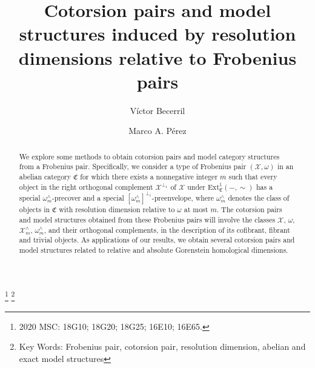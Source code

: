 \documentclass[10pt,reqno]{amsart}
\numberwithin{equation}{section}
\theoremstyle{remark}
\newcommand{\Ext}{\mathrm{Ext}}
\newcommand{\C}{\mathfrak{C}}
\newcommand{\X}{\mathcal{X}}
\begin{document}
\title[Complete Frobenius pairs]{Cotorsion pairs and model structures induced by resolution dimensions relative to Frobenius pairs}
\thanks{2020 MSC: 18G10; 18G20; 18G25; 16E10; 16E65.}
\thanks{Key Words: Frobenius pair, cotorsion pair, resolution dimension, abelian and exact model structures}

\author{V\'ictor Becerril}
\address[V. Becerril]{Centro de Ciencias Matem\'aticas. Universidad Nacional Aut\'onoma de M\'exico. 
 CP58089. Morelia, Michoac\'an, M\'EXICO}

\author{Marco A. P\'erez}
\address[M. A. P\'erez]{Instituto de Matem\'atica y Estad\'istica ``Prof. Ing. Rafael Laguardia''. Facultad de Ingenier\'ia. Universidad de la Rep\'ublica. CP11300. Montevideo, URUGUAY}



\maketitle


\begin{abstract}
We explore some methods to obtain cotorsion pairs and  model category structures from a Frobenius pair. Specifically, we consider a type of Frobenius pair $(\X,\omega)$ in an abelian category $\C$ for which there exists a nonnegative integer $m$ such that every object in the right orthogonal complement $\X^{\perp_1}$ of $\X$ under $\Ext^1_{\C}(-,\sim)$ has a special $\omega^\wedge_m$-precover and a special $[\omega^\wedge_m]^{\perp_1}$-preenvelope, where $\omega^\wedge_m$ denotes the class of objects in $\C$ with resolution dimension relative to $\omega$ at most $m$. The cotorsion pairs and model structures obtained from these Frobenius pairs will involve the classes $\X$, $\omega$, $\X^\wedge_m$, $\omega^\wedge_m$, and their orthogonal complements, in the description of its cofibrant, fibrant and trivial objects. As applications of our results, we obtain several cotorsion pairs and model structures related to relative and absolute Gorenstein homological dimensions.    
\end{abstract}


\setcounter{tocdepth}{1}
\tableofcontents


\pagestyle{myheadings}
%
         {\leftline{\scriptsize }}


\end{document}
